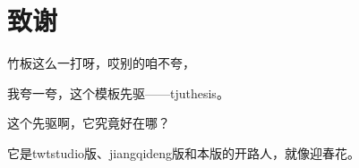 
\chapter*{致\qquad 谢}

竹板这么一打呀，哎别的咱不夸，

我夸一夸，这个模板先驱——tjuthesis。

这个先驱啊，它究竟好在哪？

它是twtstudio版、jiangqideng版和本版的开路人，就像迎春花。 